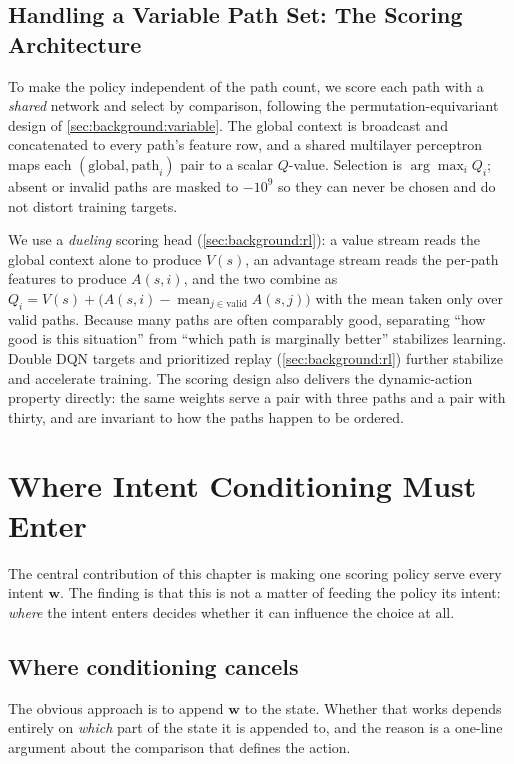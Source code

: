 \subsection{Handling a Variable Path Set: The Scoring Architecture}
\label{sec:p1design:scoring}

To make the policy independent of the path count, we score each path with a \emph{shared} network and
select by comparison, following the permutation-equivariant design of \cref{sec:background:variable}.
The global context is broadcast and concatenated to every path's feature row, and a shared multilayer
perceptron maps each $(\text{global}, \text{path}_i)$ pair to a scalar $Q$-value. Selection is
$\arg\max_i Q_i$; absent or invalid paths are masked to $-10^9$ so they can never be chosen and do not
distort training targets.

We use a \emph{dueling} scoring head (\cref{sec:background:rl}): a value stream reads the global context
alone to produce $V(s)$, an advantage stream reads the per-path features to produce $A(s, i)$, and the
two combine as $Q_i = V(s) + \big(A(s,i) - \operatorname{mean}_{j\in\text{valid}} A(s,j)\big)$ with the
mean taken only over valid paths. Because many paths are often comparably good, separating ``how good is
this situation'' from ``which path is marginally better'' stabilizes learning. Double DQN targets and
prioritized replay (\cref{sec:background:rl}) further stabilize and accelerate training. The scoring
design also delivers the dynamic-action property directly: the same weights serve a pair with three
paths and a pair with thirty, and are invariant to how the paths happen to be ordered.

\section{Where Intent Conditioning Must Enter}
\label{sec:p1design:conditioning}

The central contribution of this chapter is making one scoring policy serve every intent $\mathbf{w}$.
The finding is that this is not a matter of feeding the policy its intent: \emph{where} the intent enters
decides whether it can influence the choice at all.

\subsection{Where conditioning cancels}
\label{sec:p1design:concat}
The obvious approach is to append $\mathbf{w}$ to the state. Whether that works depends entirely on
\emph{which} part of the state it is appended to, and the reason is a one-line argument about the
comparison that defines the action.

